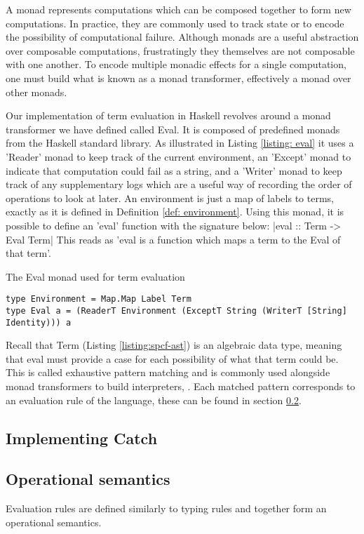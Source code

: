 \documentclass[12pt,a4paper]{report}
\theoremstyle{definition}
\theoremstyle{remark}
\begin{document}
A monad represents computations which can be composed together to form new computations. In practice, they are commonly used to track state or to encode the possibility of computational failure. Although monads are a useful abstraction over composable computations, frustratingly they themselves are not composable with one another. To encode multiple monadic effects for a single computation, one must build what is known as a monad transformer, effectively a monad over other monads.

Our implementation of term evaluation in Haskell revolves around a monad transformer we have defined called Eval. It is composed of predefined monads from the Haskell standard library. As illustrated in Listing \ref{listing: eval} it uses a 'Reader' monad to keep track of the current environment, an 'Except' monad to indicate that computation could fail as a string, and a 'Writer' monad to keep track of any supplementary logs which are a useful way of recording the order of operations to look at later. An environment is just a map of labels to terms, exactly as it is defined in Definition \ref{def: environment}. Using this monad, it is possible to define an 'eval' function with the signature below:
|eval :: Term -> Eval Term|
This reads as 'eval is a function which maps a term to the Eval of that term'. 

\begin{listing}[!ht]
\caption{The Eval monad used for term evaluation}
\begin{verbatim}
type Environment = Map.Map Label Term
type Eval a = (ReaderT Environment (ExceptT String (WriterT [String] Identity))) a
\end{verbatim}
\label{listing: eval}
\end{listing}

Recall that Term (Listing \ref{listing:spcf-ast}) is an algebraic data type, meaning that eval must provide a case for each possibility of what that term could be. This is called exhaustive pattern matching and is commonly used alongside monad transformers to build interpreters, \citep[\emph{e.g.},][]{Liang1995MonadTA}. Each matched pattern corresponds to an evaluation rule of the language, these can be found in section \ref{section: op sem}.

\subsection{Implementing Catch}

\subsection{Operational semantics}\label{section: op sem}
Evaluation rules are defined similarly to typing rules and together form an operational semantics.
\end{document}
